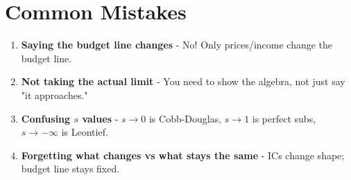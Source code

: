 \documentclass[12pt]{article}
\begin{document}
\section*{Common Mistakes}

\begin{enumerate}[leftmargin=2cm, itemsep=1em]
    \item \textbf{Saying the budget line changes} - No! Only prices/income change the budget line.

    \item \textbf{Not taking the actual limit} - You need to show the algebra, not just say "it approaches."

    \item \textbf{Confusing $s$ values} - $s \to 0$ is Cobb-Douglas, $s \to 1$ is perfect subs, $s \to -\infty$ is Leontief.

    \item \textbf{Forgetting what changes vs what stays the same} - ICs change shape; budget line stays fixed.
\end{enumerate}
\end{document}
